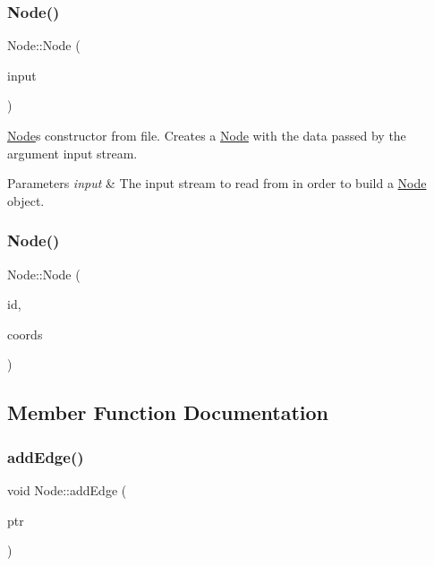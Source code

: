 \subsubsection{\texorpdfstring{Node()}{Node()}\hspace{0.1cm}{\footnotesize\ttfamily [1/2]}}
{\footnotesize\ttfamily Node\+::\+Node (\begin{DoxyParamCaption}\item[{istream \&}]{input }\end{DoxyParamCaption})}

\hyperlink{class_node}{Node}\textquotesingle{}s constructor from file. Creates a \hyperlink{class_node}{Node} with the data passed by the argument input stream.


\begin{DoxyParams}{Parameters}
{\em input} & The input stream to read from in order to build a \hyperlink{class_node}{Node} object. \\
\hline
\end{DoxyParams}
\hypertarget{class_node_aceb6d58ed1ee8fe95c532453a1f09ad2}{}\label{class_node_aceb6d58ed1ee8fe95c532453a1f09ad2} 
\subsubsection{\texorpdfstring{Node()}{Node()}\hspace{0.1cm}{\footnotesize\ttfamily [2/2]}}
{\footnotesize\ttfamily Node\+::\+Node (\begin{DoxyParamCaption}\item[{\hyperlink{_node_8hpp_a9d6265804805c2375068fd7484840dc6}{node\+\_\+id}}]{id,  }\item[{\hyperlink{class_geographic_coords}{Geographic\+Coords}}]{coords }\end{DoxyParamCaption})}



\subsection{Member Function Documentation}
\hypertarget{class_node_a9c981148bc1602d4388c6ea6428450c4}{}\label{class_node_a9c981148bc1602d4388c6ea6428450c4} 
\subsubsection{\texorpdfstring{add\+Edge()}{addEdge()}}
{\footnotesize\ttfamily void Node\+::add\+Edge (\begin{DoxyParamCaption}\item[{\hyperlink{class_edge}{Edge} $\ast$}]{ptr }\end{DoxyParamCaption})}

